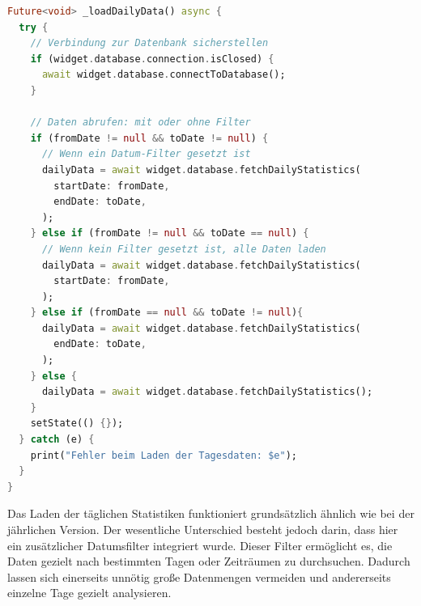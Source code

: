 \documentclass{article}
\begin{document}
    \begin{lstlisting}[language=Dart]
Future<void> _loadDailyData() async {
  try {
    // Verbindung zur Datenbank sicherstellen
    if (widget.database.connection.isClosed) {
      await widget.database.connectToDatabase();
    }

    // Daten abrufen: mit oder ohne Filter
    if (fromDate != null && toDate != null) {
      // Wenn ein Datum-Filter gesetzt ist
      dailyData = await widget.database.fetchDailyStatistics(
        startDate: fromDate,
        endDate: toDate,
      );
    } else if (fromDate != null && toDate == null) {
      // Wenn kein Filter gesetzt ist, alle Daten laden
      dailyData = await widget.database.fetchDailyStatistics(
        startDate: fromDate,
      );
    } else if (fromDate == null && toDate != null){
      dailyData = await widget.database.fetchDailyStatistics(
        endDate: toDate,
      );
    } else {
      dailyData = await widget.database.fetchDailyStatistics();
    }
    setState(() {});
  } catch (e) {
    print("Fehler beim Laden der Tagesdaten: $e");
  }
}
    \end{lstlisting}
    Das Laden der täglichen Statistiken funktioniert grundsätzlich ähnlich wie bei der jährlichen Version.
    Der wesentliche Unterschied besteht jedoch darin, dass hier ein zusätzlicher Datumsfilter integriert wurde.
    Dieser Filter ermöglicht es, die Daten gezielt nach bestimmten Tagen oder Zeiträumen zu durchsuchen.
    Dadurch lassen sich einerseits unnötig große Datenmengen vermeiden und andererseits einzelne Tage gezielt analysieren.
\end{document}

